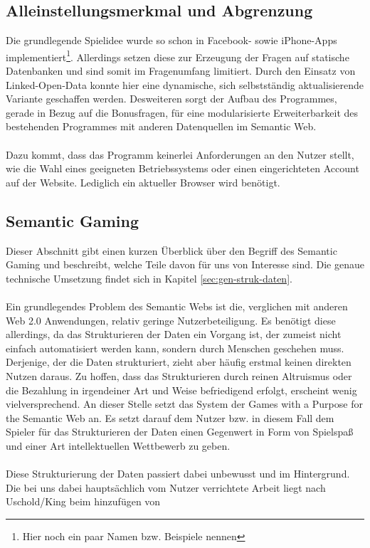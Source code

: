 \documentclass[a4paper, 11pt]{article}
\begin{document}
\subsection{Alleinstellungsmerkmal und Abgrenzung}
Die grundlegende Spielidee wurde so schon in Facebook- sowie iPhone-Apps implementiert\footnote{Hier noch ein paar Namen bzw. Beispiele nennen}. Allerdings setzen diese zur Erzeugung der Fragen auf statische Datenbanken und sind somit im Fragenumfang limitiert. Durch den Einsatz von Linked-Open-Data konnte hier eine dynamische, sich selbstständig aktualisierende Variante geschaffen werden. Desweiteren sorgt der Aufbau des Programmes, gerade in Bezug auf die Bonusfragen, für eine modularisierte Erweiterbarkeit des bestehenden Programmes mit anderen Datenquellen im Semantic Web.\\\\
Dazu kommt, dass das Programm keinerlei Anforderungen an den Nutzer stellt, wie die Wahl eines geeigneten Betriebssystems oder einen eingerichteten Account auf der Website. Lediglich ein aktueller Browser wird benötigt.
\subsection{Semantic Gaming}
Dieser Abschnitt gibt einen kurzen Überblick über den Begriff des Semantic Gaming und beschreibt, welche Teile davon für uns von Interesse sind. Die genaue technische Umsetzung findet sich in Kapitel \ref{sec:gen-struk-daten}.\\\\
Ein grundlegendes Problem des Semantic Webs ist die, verglichen mit anderen Web 2.0 Anwendungen, relativ geringe Nutzerbeteiligung.  Es benötigt diese allerdings, da das Strukturieren der Daten ein Vorgang ist, der zumeist nicht einfach automatisiert werden kann, sondern durch Menschen geschehen muss. Derjenige, der die Daten strukturiert, zieht aber häufig erstmal keinen direkten Nutzen daraus. Zu hoffen, dass das Strukturieren durch reinen Altruismus oder die Bezahlung in irgendeiner Art und Weise befriedigend erfolgt, erscheint wenig vielversprechend. An dieser Stelle setzt das System der Games with a Purpose for the Semantic Web an. Es setzt darauf dem Nutzer bzw. in diesem Fall dem Spieler für das Strukturieren der Daten einen Gegenwert in Form von Spielspaß und einer Art intellektuellen Wettbewerb zu geben.\\\\
Diese Strukturierung der Daten passiert dabei unbewusst und im Hintergrund. Die bei uns dabei hauptsächlich vom Nutzer verrichtete Arbeit liegt nach Uschold/King beim hinzufügen von 
\newpage
\end{document}
